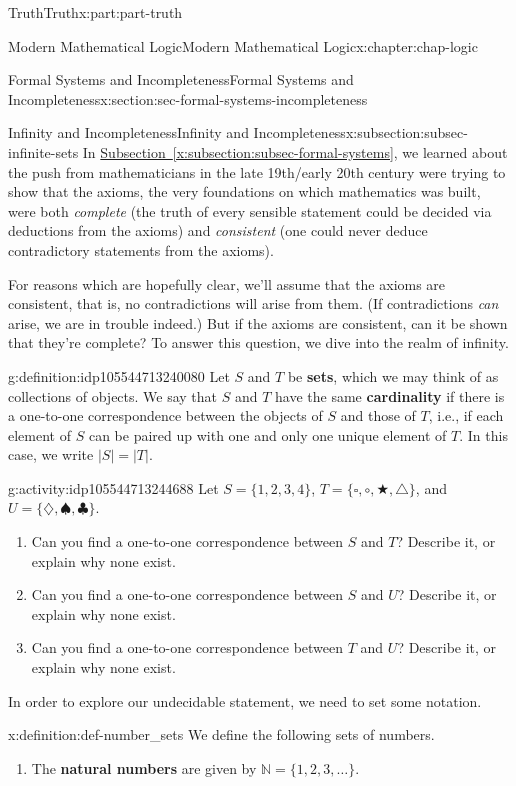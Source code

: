\documentclass[oneside,10pt,]{book}
\newcommand{\xreffont}{\relax}
\newcommand{\terminology}[1]{\textbf{#1}}
\numberwithin{equation}{section}
\begin{document}
\begin{partptx}{Truth}{}{Truth}{}{}{x:part:part-truth}
\begin{chapterptx}{Modern Mathematical Logic}{}{Modern Mathematical Logic}{}{}{x:chapter:chap-logic}
\begin{sectionptx}{Formal Systems and Incompleteness}{}{Formal Systems and Incompleteness}{}{}{x:section:sec-formal-systems-incompleteness}
\begin{subsectionptx}{Infinity and Incompleteness}{}{Infinity and Incompleteness}{}{}{x:subsection:subsec-infinite-sets}
In \hyperref[x:subsection:subsec-formal-systems]{Subsection~{\xreffont\ref{x:subsection:subsec-formal-systems}}}, we learned about the push from mathematicians in the late 19th\slash{}early 20th century were trying to show that the axioms, the very foundations on which mathematics was built, were both \emph{complete} (the truth of every sensible statement could be decided via deductions from the axioms) and \emph{consistent} (one could never deduce contradictory statements from the axioms).%
\par
For reasons which are hopefully clear, we'll assume that the axioms are consistent, that is, no contradictions will arise from them. (If contradictions \emph{can} arise, we are in trouble indeed.) But if the axioms are consistent, can it be shown that they're complete? To answer this question, we dive into the realm of infinity.%
\begin{definition}{}{g:definition:idp105544713240080}%
Let \(S\) and \(T\) be \terminology{sets}, which we may think of as collections of objects. We say that \(S\) and \(T\) have the same \terminology{cardinality} if there is a one-to-one correspondence between the objects of \(S\) and those of \(T\), i.e., if each element of \(S\) can be paired up with one and only one unique element of \(T\). In this case, we write \(|S| = |T|\).%
\end{definition}
\begin{activity}{}{g:activity:idp105544713244688}%
Let \(S = \{1,2,3,4\}\), \(T=\{\square,\circ,\bigstar,\triangle\}\), and \(U = \{\diamondsuit,\spadesuit,\clubsuit\}\).%
%
\begin{enumerate}
\item{}Can you find a one-to-one correspondence between \(S\) and \(T\)? Describe it, or explain why none exist.%
\item{}Can you find a one-to-one correspondence between \(S\) and \(U\)? Describe it, or explain why none exist.%
\item{}Can you find a one-to-one correspondence between \(T\) and \(U\)? Describe it, or explain why none exist.%
\end{enumerate}
\end{activity}%
In order to explore our undecidable statement, we need to set some notation.%
\begin{definition}{}{x:definition:def-number_sets}%
We define the following sets of numbers.%
%
\begin{enumerate}
\item{}The \terminology{natural numbers} are given by \(\mathbb{N} = \{1, 2, 3, \ldots\}\).%

\end{enumerate}
\end{definition}
\end{subsectionptx}
\end{sectionptx}
\end{chapterptx}
\end{partptx}
\end{document}
